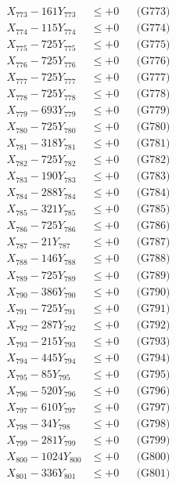 \documentclass[a4paper,10pt]{article}
\begin{document}
{\begin{align}
X_{773} - 161Y_{773} &\leq +0 && \text{(G773)} \\
X_{774} - 115Y_{774} &\leq +0 && \text{(G774)} \\
X_{775} - 725Y_{775} &\leq +0 && \text{(G775)} \\
X_{776} - 725Y_{776} &\leq +0 && \text{(G776)} \\
X_{777} - 725Y_{777} &\leq +0 && \text{(G777)} \\
X_{778} - 725Y_{778} &\leq +0 && \text{(G778)} \\
X_{779} - 693Y_{779} &\leq +0 && \text{(G779)} \\
X_{780} - 725Y_{780} &\leq +0 && \text{(G780)} \\
\allowbreak
X_{781} - 318Y_{781} &\leq +0 && \text{(G781)} \\
X_{782} - 725Y_{782} &\leq +0 && \text{(G782)} \\
X_{783} - 190Y_{783} &\leq +0 && \text{(G783)} \\
X_{784} - 288Y_{784} &\leq +0 && \text{(G784)} \\
X_{785} - 321Y_{785} &\leq +0 && \text{(G785)} \\
X_{786} - 725Y_{786} &\leq +0 && \text{(G786)} \\
X_{787} - 21Y_{787} &\leq +0 && \text{(G787)} \\
X_{788} - 146Y_{788} &\leq +0 && \text{(G788)} \\
X_{789} - 725Y_{789} &\leq +0 && \text{(G789)} \\
X_{790} - 386Y_{790} &\leq +0 && \text{(G790)} \\
\allowbreak
X_{791} - 725Y_{791} &\leq +0 && \text{(G791)} \\
X_{792} - 287Y_{792} &\leq +0 && \text{(G792)} \\
X_{793} - 215Y_{793} &\leq +0 && \text{(G793)} \\
X_{794} - 445Y_{794} &\leq +0 && \text{(G794)} \\
X_{795} - 85Y_{795} &\leq +0 && \text{(G795)} \\
X_{796} - 520Y_{796} &\leq +0 && \text{(G796)} \\
X_{797} - 610Y_{797} &\leq +0 && \text{(G797)} \\
X_{798} - 34Y_{798} &\leq +0 && \text{(G798)} \\
X_{799} - 281Y_{799} &\leq +0 && \text{(G799)} \\
X_{800} - 1024Y_{800} &\leq +0 && \text{(G800)} \\
\allowbreak
X_{801} - 336Y_{801} &\leq +0 && \text{(G801)} \\

\end{align}}
\end{document}
